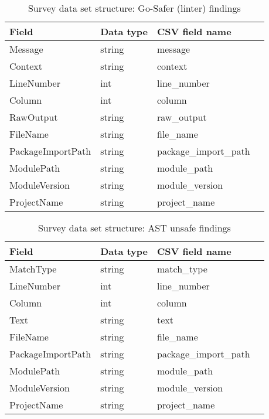         \begin{table}[h]
            \centering
            \caption{Survey data set structure: Go-Safer (linter) findings}
            \label{tbl:datastructure-linter-findings}
            \begin{tabular}{llll}
                \toprule
                Field & Data type & CSV field name \\
                \midrule
                Message              & string & message \\
                Context              & string & context \\
                LineNumber           & int    & line\_number \\
                Column               & int    & column \\
                RawOutput            & string & raw\_output \\
                FileName             & string & file\_name \\
                PackageImportPath    & string & package\_import\_path \\
                ModulePath           & string & module\_path \\
                ModuleVersion        & string & module\_version \\
                ProjectName          & string & project\_name \\
                \bottomrule
            \end{tabular}
        \end{table}

        \begin{table}[h]
            \centering
            \caption{Survey data set structure: AST unsafe findings}
            \label{tbl:datastructure-ast-findings}
            \begin{tabular}{llll}
                \toprule
                Field & Data type & CSV field name \\
                \midrule
                MatchType            & string & match\_type \\
                LineNumber           & int    & line\_number \\
                Column               & int    & column \\
                Text                 & string & text \\
                FileName             & string & file\_name \\
                PackageImportPath    & string & package\_import\_path \\
                ModulePath           & string & module\_path \\
                ModuleVersion        & string & module\_version \\
                ProjectName          & string & project\_name \\
                \bottomrule
            \end{tabular}
        \end{table}

